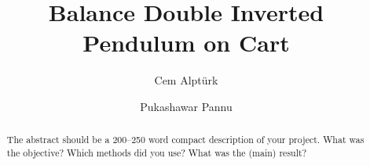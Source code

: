 \documentclass{LTHtwocol} %
\begin{document}
\begin{frontmatter}
\title{Balance Double Inverted Pendulum on Cart} %

\author[cem]{Cem Alpt\"urk}
\author[pukashawar]{Pukashawar Pannu}


\begin{abstract}
    The abstract should be a 200--250 word compact description of your project. What was the objective? Which methods did you use? What was the (main) result?
\end{abstract}

\end{frontmatter}

\end{document}
